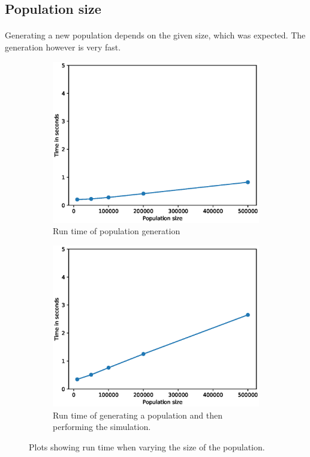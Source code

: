 \documentclass[runningheads]{llncs}
\begin{document}
\subsection{Population size}

\paragraph{} Generating a new population depends on the given size, which was expected. The generation however is very fast.

\begin{figure}[h!]
	\centering
	\begin{subfigure}[b]{0.7\linewidth}
		\includegraphics[width=\textwidth]{3_Performance_Profiling/3_genpop_popsize.eps}
		\caption{Run time of population generation} 
	\end{subfigure}
	\begin{subfigure}[b]{0.7\linewidth}
		\includegraphics[width=\textwidth]{3_Performance_Profiling/3_sim_popsize.eps}
		\caption{Run time of generating a population and then performing the simulation.} 
	\end{subfigure}
	\caption{Plots showing run time when varying the size of the population.}
	\label{Gprof_popsize}
\end{figure}
\end{document}
